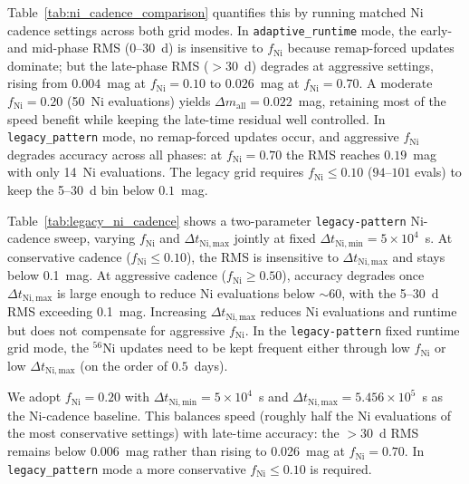 \documentclass[twocolumn,linenumbers]{aastex701}
\begin{document}
Table~\ref{tab:ni_cadence_comparison} quantifies this by running matched Ni cadence settings across both grid modes. In \texttt{adaptive\_\-runtime} mode, the early- and mid-phase RMS (0--30~d) is insensitive to $f_{\mathrm{Ni}}$ because remap-forced updates dominate; but the late-phase RMS ($>30$~d) degrades at aggressive settings, rising from $0.004$~mag at $f_{\mathrm{Ni}} = 0.10$ to $0.026$~mag at $f_{\mathrm{Ni}} = 0.70$. A moderate $f_{\mathrm{Ni}} = 0.20$ (50~Ni evaluations) yields $\Delta m_\mathrm{all} = 0.022$~mag, retaining most of the speed benefit while keeping the late-time residual well controlled. In \texttt{legacy\_\-pattern} mode, no remap-forced updates occur, and aggressive $f_{\mathrm{Ni}}$ degrades accuracy across all phases: at $f_{\mathrm{Ni}} = 0.70$ the RMS reaches $0.19$~mag with only 14~Ni evaluations. The legacy grid requires $f_{\mathrm{Ni}} \leq 0.10$ ($94$--$101$ evals) to keep the 5--30~d bin below $0.1$~mag.

Table~\ref{tab:legacy_ni_cadence} shows a two-parameter \texttt{legacy-pattern} Ni-cadence sweep, varying $f_{\mathrm{Ni}}$ and $\Delta t_{\mathrm{Ni,max}}$ jointly at fixed $\Delta t_{\mathrm{Ni,min}} = 5\times10^4$~s. At conservative cadence ($f_{\mathrm{Ni}} \leq 0.10$), the RMS is insensitive to $\Delta t_{\mathrm{Ni,max}}$ and stays below 0.1~mag. At aggressive cadence ($f_{\mathrm{Ni}} \geq 0.50$), accuracy degrades once $\Delta t_{\mathrm{Ni,max}}$ is large enough to reduce Ni evaluations below ${\sim}60$, with the 5--30~d RMS exceeding 0.1~mag. Increasing $\Delta t_{\mathrm{Ni,max}}$ reduces Ni evaluations and runtime but does not compensate for aggressive $f_{\mathrm{Ni}}$. In the \texttt{legacy-pattern} fixed runtime grid mode, the $^{56}$Ni updates need to be kept frequent either through low $f_{\mathrm{Ni}}$ or low $\Delta t_{\mathrm{Ni,max}}$ (on the order of $0.5$~days).

We adopt $f_{\mathrm{Ni}} = 0.20$ with $\Delta t_{\mathrm{Ni,min}} = 5\times10^4$~s and $\Delta t_{\mathrm{Ni,max}} = 5.456\times10^5$~s as the Ni-cadence baseline. This balances speed (roughly half the Ni evaluations of the most conservative settings) with late-time accuracy: the $>30$~d RMS remains below 0.006~mag rather than rising to 0.026~mag at $f_{\mathrm{Ni}} = 0.70$. In \texttt{legacy\_\-pattern} mode a more conservative $f_{\mathrm{Ni}} \leq 0.10$ is required.
\end{document}
